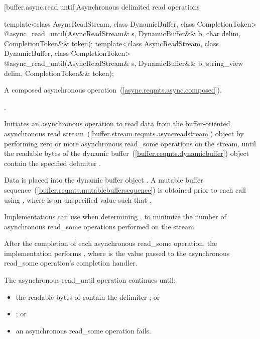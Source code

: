[buffer.async.read.until]{Asynchronous delimited read operations}

%
\begin{itemdecl}
template<class AsyncReadStream, class DynamicBuffer, class CompletionToken>
  @\DEDUCED@ async_read_until(AsyncReadStream& s,
                           DynamicBuffer&& b, char delim,
                           CompletionToken&& token);
template<class AsyncReadStream, class DynamicBuffer, class CompletionToken>
  @\DEDUCED@ async_read_until(AsyncReadStream& s,
                           DynamicBuffer&& b, string_view delim,
                           CompletionToken&& token);
\end{itemdecl}

\begin{itemdescr}
\pnum
A composed asynchronous operation~(\ref{async.reqmts.async.composed}).

\pnum
\completionsig {}.

\pnum
\effects Initiates an asynchronous operation to read data from the buffer-oriented asynchronous read stream~(\ref{buffer.stream.reqmts.asyncreadstream}) object  by performing zero or more asynchronous read_some operations on the stream, until the readable bytes of the dynamic buffer~(\ref{buffer.reqmts.dynamicbuffer}) object  contain the specified delimiter .

\pnum
Data is placed into the dynamic buffer object . A mutable buffer sequence~(\ref{buffer.reqmts.mutablebuffersequence}) is obtained prior to each  call using , where  is an unspecified value such that . \begin{note} Implementations can use  when determining , to minimize the number of asynchronous read_some operations performed on the stream. \end{note} After the completion of each asynchronous read_some operation, the implementation performs , where  is the value passed to the asynchronous read_some operation's completion handler.

\pnum
The asynchronous read_until operation continues until:

\begin{itemize}
\item
the readable bytes of  contain the delimiter ; or
\item
{}; or
\item
an asynchronous read_some operation fails.
\end{itemize}


\end{itemdescr}
